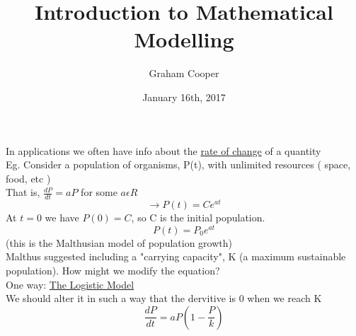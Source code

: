 \documentclass[12pt]{article}
\title{\vspace{-15ex}Introduction to Mathematical Modelling\vspace{-1ex}}
\date{January 16th, 2017}
\author{Graham Cooper}
\begin{document}
	\maketitle
	
	In applications we often have info about the \underline{rate of change} of a quantity\\
	Eg. Consider a population of organisms, P(t), with unlimited resources ( space, food, etc )\\
	That is, $\frac{dP}{dt} = aP$ for some $a \epsilon R$\\
	$$\rightarrow P(t) = Ce^{at}$$
	At $t=0$ we have $P(0) = C$, so C is the initial population.\\
	$$P(t) = P_0e^{at}$$
	(this is the Malthusian model of population growth)\\
	Malthus suggested including a "carrying capacity", K (a maximum sustainable population). How might we modify the equation?\\
	
	One way: \underline{The Logistic Model}\\
	We should alter it in such a way that the dervitive is 0 when we reach K\\
	$$\frac{dP}{dt} = aP(1-\frac{P}{k})$$
	
	
\end{document}
